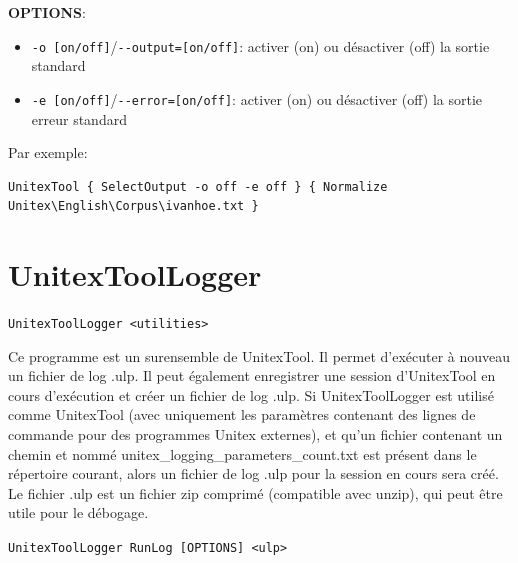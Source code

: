 \bigskip
\noindent \textbf{OPTIONS}:
\begin{itemize}
\item \verb+-o [on/off]+/\verb+--output=[on/off]+: activer (on) ou désactiver (off) la sortie standard
\item \verb+-e [on/off]+/\verb+--error=[on/off]+: activer (on) ou désactiver (off) la sortie erreur standard
\end{itemize} 
 
\noindent Par exemple:
\begin{verbatim}
UnitexTool { SelectOutput -o off -e off } { Normalize
Unitex\English\Corpus\ivanhoe.txt }
\end{verbatim}






\section{UnitexToolLogger}
\label{section-UnitexToolLogger}
\verb+UnitexToolLogger <utilities>+

\bigskip
\noindent Ce programme est un surensemble de UnitexTool. Il permet d'exécuter à nouveau un
fichier de log .ulp.
Il peut également enregistrer une session d'UnitexTool en cours d'exécution et créer un fichier de
log .ulp.
Si UnitexToolLogger est utilisé comme UnitexTool (avec uniquement les paramètres contenant des lignes de
	commande pour des programmes Unitex externes), et qu'un fichier contenant un chemin et nommé
unitex\_logging\_parameters\_count.txt est présent dans le répertoire courant, alors
un fichier de log .ulp pour la session en cours sera créé.
Le fichier .ulp est un fichier zip comprimé (compatible avec unzip), qui peut être utile pour le débogage.

\bigskip
\verb+UnitexToolLogger RunLog [OPTIONS] <ulp>+

